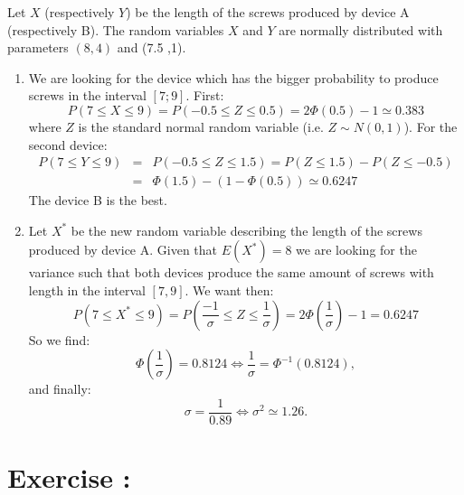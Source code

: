 \documentclass[12pt,thmsa]{article}
\begin{document}
Let $X$ (respectively $Y$) be the length of the screws produced by device A (respectively B). The random
variables $X$ and $Y$ are normally distributed with parameters $(8,4)$ and (7.5 ,1).
\begin{enumerate}
  \item We are looking for the device which has the bigger probability to produce screws in the interval $[ 7; 9]$. First:
  \begin{equation*}
  P(7\leq X \leq 9)= P(-0.5\leq Z \leq 0.5)=2 \Phi(0.5)-1 \simeq 0.383
  \end{equation*}
  where $Z$ is the standard normal random variable (i.e. $Z\sim N(0,1)$).
  For the second device:
  \begin{eqnarray*}
  P(7\leq Y \leq 9)&=& P(-0.5\leq Z \leq 1.5)=P(Z \leq 1.5)-P(Z\leq -0.5) \\
  &=&\Phi(1.5)- (1-\Phi(0.5)) \simeq 0.6247
  \end{eqnarray*}
  The device B is the best.

  \item Let $X^*$ be the new random variable describing the length of the screws produced by device A. Given that $E(X^*)=8$ we are looking for the variance such
  that both devices produce the same amount of screws with length in the interval $[7,9]$.
  We want then:
  \begin{equation*}
  P(7\leq X^* \leq 9)= P\left(\frac{-1}{\sigma}\leq Z \leq \frac{1}{\sigma}\right)=2 \Phi\left(\frac{1}{\sigma}\right)-1 = 0.6247
  \end{equation*}
  So we find:
  \begin{equation*}
    \Phi\left(\frac{1}{\sigma}\right)=0.8124  \Leftrightarrow \frac{1}{\sigma}= \Phi^{-1}(0.8124) ,
  \end{equation*}
  and finally:
   \begin{equation*}
   \sigma =\frac{1}{0.89}  \Leftrightarrow \sigma^2 \simeq 1.26.
  \end{equation*}

\end{enumerate}


\addtocounter{section}{1}
\section*{Exercise \thesection:}
\end{document}

